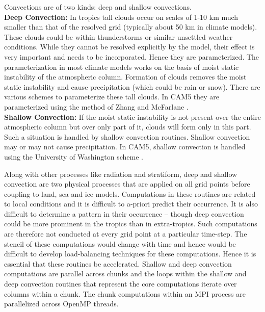 Convections are of two kinds: deep and shallow convections. \\
{\bf Deep Convection:} In tropics tall clouds occur on scales of 1-10 km much smaller than that of the resolved grid (typically about 50 km in climate models).  These clouds could be within thunderstorms or similar unsettled weather conditions.  While they cannot be resolved explicitly by the model, their effect is very important and needs to be incorporated. Hence they are parameterized. The parameterization in most climate models works on the basis of moist static instability of the atmospheric column. Formation of clouds removes the moist static instability and cause precipitation (which could be rain or snow). There are various schemes to parameterize these tall clouds. In CAM5 they are parameterized using the method of Zhang and McFarlane \cite{zhang-sensitivity-atmocn1995}. \\
{\bf Shallow Convection:} If the moist static instability is not present over the entire atmospheric column but over only part of it, clouds will form only in this part. Such a situation is handled by shallow convection routines. Shallow convection may or may not cause precipitation. In CAM5, shallow convection is handled using the University of Washington scheme \cite{park-UWshallowconvect-jc2009}.

Along  with  other  processes  like radiation  and  stratiform,  deep  and  shallow  convection  are  two  physical  processes that  are  applied  on  all  grid  points  before  coupling  to  land,  sea  and  ice  models.  Computations in these routines are related to local conditions and it is difficult to a-priori predict their occurrence. It is also difficult to determine a pattern in their occurrence -- though deep convection could be more prominent in the tropics than in extra-tropics. Such computations are therefore not conducted at every grid point at a particular time-step. The stencil of these computations would change with time and hence would be difficult to develop load-balancing techniques for these computations. Hence it is essential that these routines be accelerated.  Shallow and deep convection computations are parallel across chunks and the loops  within  the  shallow  and  deep  convection  routines  that  represent  the  core computations  iterate  over  columns  within  a  chunk. The chunk computations within an MPI process are parallelized across OpenMP threads.


